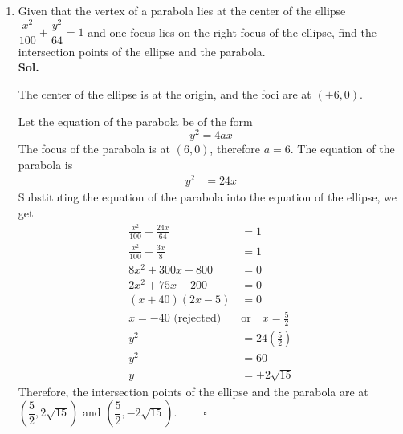 \documentclass{report}
\newcommand{\sol}{\vspace{1em}\\\textbf{Sol.}}
\newcommand{\eos}{ \qquad \square}
\begin{document}
\begin{enumerate}
          \newpage
    \item Given that the vertex of a parabola lies at the center of the ellipse
          $\dfrac{x^2}{100} + \dfrac{y^2}{64} = 1$ and one focus lies on the right focus
          of the ellipse, find the intersection points of the ellipse and the parabola.
          \sol{}

          The center of the ellipse is at the origin, and the foci are at $(\pm 6, 0)$.

          Let the equation of the parabola be of the form
          \begin{equation*}
              y^2 = 4ax
          \end{equation*}
          The focus of the parabola is at $(6, 0)$, therefore $a=6$. The equation of the parabola is
          \begin{align*}
              y^2 & = 24x
          \end{align*}
          Substituting the equation of the parabola into the equation of the ellipse, we get
          \begin{align*}
              \frac{x^2}{100} + \frac{24x}{64}                               & = 1                             \\
              \frac{x^2}{100} + \frac{3x}{8}                                 & = 1                             \\
              8x^2 + 300x - 800                                              & = 0                             \\
              2x^2 + 75x - 200                                               & = 0                             \\
              (x + 40)(2x - 5)                                               & = 0                             \\
              x                               = -40 \text{ (rejected)} \quad & \text{or} \quad x = \frac{5}{2} \\
              y^2                                                            & = 24\left(\frac{5}{2}\right)    \\
              y^2                                                            & = 60                            \\
              y                                                              & = \pm 2\sqrt{15}
          \end{align*}
          Therefore, the intersection points of the ellipse and the parabola are at $\left(\dfrac{5}{2}, 2\sqrt{15}\right)$ and $\left(\dfrac{5}{2}, -2\sqrt{15}\right)$. $\eos$


\end{enumerate}
\end{document}
